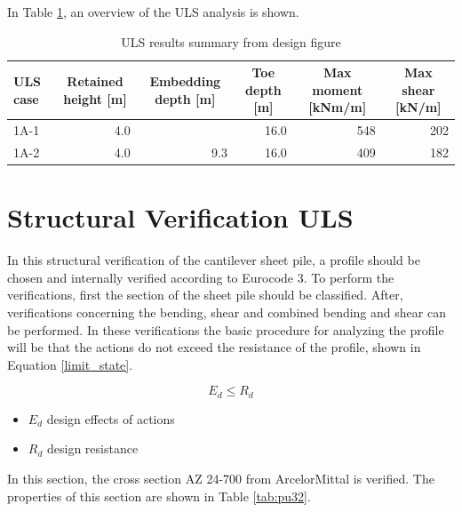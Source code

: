 In Table \ref{tab:uls_summary}, an overview of the ULS analysis is shown. 

\begin{table}[H]
  \centering
  \caption{ULS results summary from design figure}
  \label{tab:uls_summary}
  \small
  \setlength{\tabcolsep}{8pt}
  \renewcommand{\arraystretch}{1.15}
  \begin{tabular}{@{}l r r r r r@{}}
    \toprule
    ULS case & \multicolumn{1}{c}{Retained height [m]} & \multicolumn{1}{c}{Embedding depth [m]} & \multicolumn{1}{c}{Toe depth [m]} & \multicolumn{1}{c}{Max moment [kNm/m]} & \multicolumn{1}{c}{Max shear [kN/m]} \\
    \midrule
    1A-1   & 4.0 &  & 16.0 & 548 & 202 \\
    1A-2  & 4.0 & 9.3 & 16.0 & 409 & 182 \\
    \bottomrule
  \end{tabular}
\end{table}


\section{Structural Verification ULS}

In this structural verification of the cantilever sheet pile, a profile should be chosen and internally verified according to Eurocode 3. To perform the verifications, first the section of the sheet pile should be classified. After, verifications concerning the bending, shear and combined bending and shear can be performed. In these verifications the basic procedure for analyzing the profile will be that the actions do not exceed the resistance of the profile, shown in Equation \ref{limit_state}.


\begin{equation}
    E_{d} \leq R_{d}
    \label{limit_state}
\end{equation}

\begin{itemize}
    \item $E_{d}$    design effects of actions
    \item $R_{d}$   design resistance
\end{itemize}

In this section, the cross section AZ 24-700 from ArcelorMittal is verified. The properties of this section are shown in Table \ref{tab:pu32}.

